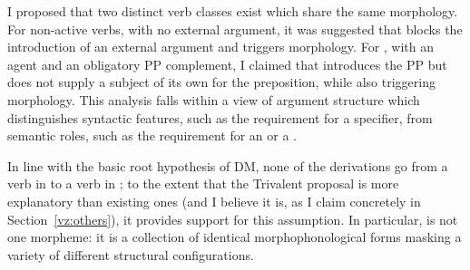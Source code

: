 \begin{exe}
\begin{xlist}
\begin{xlist}
\begin{exe}
\begin{xlist}
\begin{xlist}
\begin{exe}
\begin{xlist}
\begin{xlist}
\begin{exe}
\begin{exe}
\begin{xlist}
\begin{exe}
\begin{exe}
\begin{xlist}
\begin{exe}
\begin{exe}
\begin{exe}
\begin{exe}
\begin{exe}
\begin{xlist}
\begin{exe}
\begin{xlist}
\begin{exe}
\begin{exe}
\begin{xlist}
\begin{exe}
\begin{xlist}
\begin{exe}
\begin{exe}
\begin{exe}
\begin{xlist}
\begin{exe}
\begin{exe}
\begin{exe}
\begin{xlist}
\begin{exe}
\begin{xlist}
\begin{exe}
\begin{xlist}
\begin{exe}
\begin{xlist}
\begin{exe}
\begin{exe}
\begin{exe}
\begin{exe}
\begin{xlist}
\begin{exe}
\begin{xlist}
\begin{exe}
\begin{xlist}
\begin{exe}
\begin{xlist}
\begin{exe}
\begin{xlist}
\begin{exe}
\begin{xlist}
\begin{exe}
\begin{exe}
\begin{exe}
\begin{exe}
\begin{xlist}
\begin{exe}
\begin{xlist}
\begin{exe}
\begin{xlist}
\begin{exe}
I proposed that two distinct verb classes exist which share the same morphology. For non-active verbs, with no external argument, it was suggested that {\vz} blocks the introduction of an external argument and triggers {\tnif} morphology. For , with an agent and an obligatory PP complement, I claimed that {\pz} introduces the PP but does not supply a subject of its own for the preposition, while also triggering {\tnif} morphology. This analysis falls within a view of argument structure which distinguishes syntactic features, such as the requirement for a specifier, from semantic roles, such as the requirement for an  or a .

In line with the basic root hypothesis of DM, none of the derivations go from a verb in {\tkal} to a verb in {\tnif}; to the extent that the Trivalent proposal is more explanatory than existing ones (and I believe it is, as I claim concretely in Section~\ref{vz:others}), it provides support for this assumption. In particular, {\tnif} is not one morpheme: it is a collection of identical morphophonological forms masking a variety of different structural configurations.


\end{exe}
\end{xlist}
\end{exe}
\end{xlist}
\end{exe}
\end{xlist}
\end{exe}
\end{exe}
\end{exe}
\end{exe}
\end{xlist}
\end{exe}
\end{xlist}
\end{exe}
\end{xlist}
\end{exe}
\end{xlist}
\end{exe}
\end{xlist}
\end{exe}
\end{xlist}
\end{exe}
\end{exe}
\end{exe}
\end{exe}
\end{xlist}
\end{exe}
\end{xlist}
\end{exe}
\end{xlist}
\end{exe}
\end{xlist}
\end{exe}
\end{exe}
\end{exe}
\end{xlist}
\end{exe}
\end{exe}
\end{exe}
\end{xlist}
\end{exe}
\end{xlist}
\end{exe}
\end{exe}
\end{xlist}
\end{exe}
\end{xlist}
\end{exe}
\end{exe}
\end{exe}
\end{exe}
\end{exe}
\end{xlist}
\end{exe}
\end{exe}
\end{xlist}
\end{exe}
\end{exe}
\end{xlist}
\end{xlist}
\end{exe}
\end{xlist}
\end{xlist}
\end{exe}
\end{xlist}
\end{xlist}
\end{exe}
